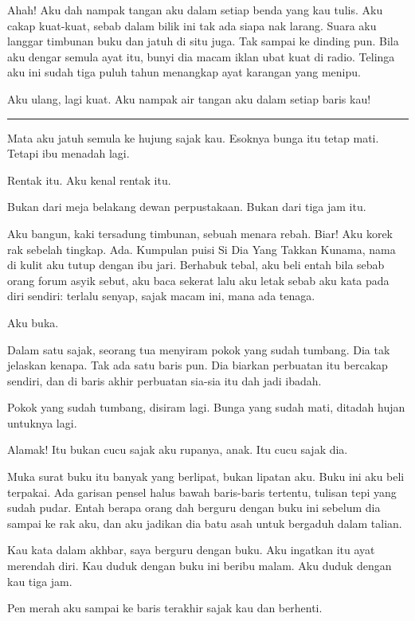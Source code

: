 \documentclass[
  11pt,
  a5paper,
  openany,
  oneside]{book}
\begin{document}
Ahah! Aku dah nampak tangan aku dalam setiap benda yang kau tulis. Aku
cakap kuat-kuat, sebab dalam bilik ini tak ada siapa nak larang. Suara
aku langgar timbunan buku dan jatuh di situ juga. Tak sampai ke dinding
pun. Bila aku dengar semula ayat itu, bunyi dia macam iklan ubat kuat di
radio. Telinga aku ini sudah tiga puluh tahun menangkap ayat karangan
yang menipu.

Aku ulang, lagi kuat. Aku nampak air tangan aku dalam setiap baris kau!

\begin{center}\rule{0.5\linewidth}{0.5pt}\end{center}

Mata aku jatuh semula ke hujung sajak kau. Esoknya bunga itu tetap mati.
Tetapi ibu menadah lagi.

Rentak itu. Aku kenal rentak itu.

Bukan dari meja belakang dewan perpustakaan. Bukan dari tiga jam itu.

Aku bangun, kaki tersadung timbunan, sebuah menara rebah. Biar! Aku
korek rak sebelah tingkap. Ada. Kumpulan puisi Si Dia Yang Takkan
Kunama, nama di kulit aku tutup dengan ibu jari. Berhabuk tebal, aku
beli entah bila sebab orang forum asyik sebut, aku baca sekerat lalu aku
letak sebab aku kata pada diri sendiri: terlalu senyap, sajak macam ini,
mana ada tenaga.

Aku buka.

Dalam satu sajak, seorang tua menyiram pokok yang sudah tumbang. Dia tak
jelaskan kenapa. Tak ada satu baris pun. Dia biarkan perbuatan itu
bercakap sendiri, dan di baris akhir perbuatan sia-sia itu dah jadi
ibadah.

Pokok yang sudah tumbang, disiram lagi. Bunga yang sudah mati, ditadah
hujan untuknya lagi.

Alamak! Itu bukan cucu sajak aku rupanya, anak. Itu cucu sajak dia.

Muka surat buku itu banyak yang berlipat, bukan lipatan aku. Buku ini
aku beli terpakai. Ada garisan pensel halus bawah baris-baris tertentu,
tulisan tepi yang sudah pudar. Entah berapa orang dah berguru dengan
buku ini sebelum dia sampai ke rak aku, dan aku jadikan dia batu asah
untuk bergaduh dalam talian.

Kau kata dalam akhbar, saya berguru dengan buku. Aku ingatkan itu ayat
merendah diri. Kau duduk dengan buku ini beribu malam. Aku duduk dengan
kau tiga jam.

Pen merah aku sampai ke baris terakhir sajak kau dan berhenti.
\end{document}
